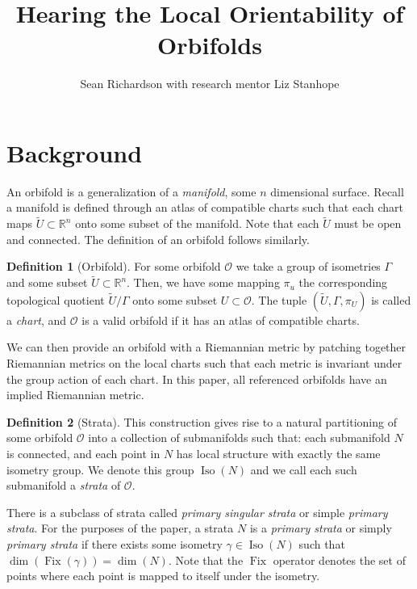 \documentclass{article}[12pt]
\theoremstyle{definition}
\newtheorem*{definition}{Definition}
\newcommand{\orb}{\mathcal{O}}
\DeclareMathOperator{\iso}{Iso}
\DeclareMathOperator{\fix}{Fix}
\begin{document}
\singlespacing
\title{Hearing the Local Orientability of Orbifolds}
\author{Sean Richardson with research mentor Liz Stanhope}
\date{}
\maketitle
\thispagestyle{fancy}

\section{Background}

An orbifold is a generalization of a
\emph{manifold}, some $n$ dimensional surface. Recall a manifold is
defined through an atlas of compatible charts such that each chart maps
$\widetilde{U} \subset \mathbb{R}^n$ onto some subset of the manifold.
Note that each $\widetilde{U}$ must be open and connected.
The definition of an orbifold follows similarly.

\begin{definition}[Orbifold]
    For some orbifold $\mathcal{O}$ we take a group of isometries
    $\Gamma$ and some subset $\widetilde{U} \subset \mathbb{R}^n$. Then, we
    have some mapping $\pi_u$ the corresponding topological quotient
    $\widetilde{U}/\Gamma$ onto some subset $U \subset \mathcal{O}$. The
    tuple $(\widetilde{U},\Gamma,\pi_U)$ is called a \emph{chart}, and
    $\mathcal{O}$ is a valid orbifold if it has an atlas of compatible
    charts.
\end{definition}

We can then provide an orbifold with a Riemannian metric by patching
together Riemannian metrics on the local charts such that each metric is
invariant under the group action of each chart. In this paper, all
referenced orbifolds have an implied Riemannian metric.

\begin{definition}[Strata]
This construction gives rise to a natural partitioning of some orbifold
$\orb$ into a collection of submanifolds such that: each submanifold $N$ is
connected, and each point in $N$ has local structure with exactly the same
isometry group. We denote this group $\iso(N)$ and we call each such submanifold a \emph{strata} of $\orb$.
\end{definition}

There is a subclass of strata called \emph{primary singular strata} or
simple \emph{primary strata}. For the purposes of the paper, a strata $N$
is a \emph{primary strata} or simply \emph{primary strata} if
there exists some isometry $\gamma \in \iso(N)$ such that
$\dim(\fix(\gamma)) = \dim(N)$. Note that the $\fix$ operator denotes the
set of points where each point is mapped to itself under the isometry.
\end{document}
